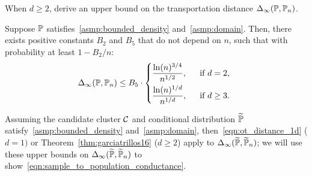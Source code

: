 When $d \geq 2$, \cite{garciatrillos16b} derive an upper bound on the transportation distance $\Delta_{\infty}(\mathbb{P},\mathbb{P}_n)$.
\begin{theorem}
	\label{thm:garciatrillos16}
	Suppose $\mathbb{P}$ satisfies~\ref{asmp:bounded_density} and~\ref{asmp:domain}. Then, there exists positive constants $B_{2}$ and $B_5$ that do not depend on $n$, such that with probability at least $1 - B_2/n$:
	\begin{equation*}
	\Delta_{\infty}(\mbb{P},\mbb{P}_n) \leq B_5 \cdot 
	\begin{dcases*}
	\frac{\ln(n)^{3/4}}{n^{1/2}},&~~\textrm{if $d = 2$,} \\
	\frac{\ln(n)^{1/d}}{n^{1/d}},&~~\textrm{if $d \geq 3$.}
	\end{dcases*}
	\end{equation*}
\end{theorem}
Assuming the candidate cluster $\mathcal{C}$ and conditional distribution $\widetilde{\mathbb{P}}$ satisfy~\ref{asmp:bounded_density} and~\ref{asmp:domain}, then~\eqref{eqn:ot_distance_1d} ($d = 1)$ or Theorem~\ref{thm:garciatrillos16} ($d \geq 2$) apply to $\Delta_{\infty}(\widetilde{\mathbb{P}},\widetilde{\mathbb{P}}_n)$; we will use these upper bounds on $\Delta_{\infty}(\widetilde{\mathbb{P}},\widetilde{\mathbb{P}}_n)$ to show~\eqref{eqn:sample_to_population_conductance}.  


